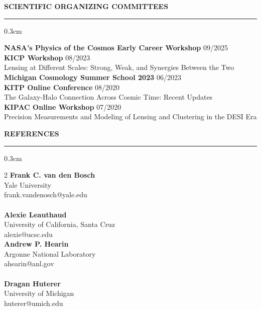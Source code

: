 \documentclass[12pt]{article}
\renewenvironment{section}[1]
  {
  \medskip
  {\color{aublue} \MakeUppercase{\bf #1}}
  \smallskip
  \hrule
  \medskip
  \begin{adjustwidth}{0.3cm}{}
  }
  {
  \end{adjustwidth}
  }
\newcommand{\entry}[3]{{\bf #1} \hfill {#2} \\ {#3}}
\begin{document}
\begin{section}{Scientific Organizing Committees}
  \entry{NASA's Physics of the Cosmos Early Career Workshop}{09/2025}{}
  \entry{KICP Workshop}{08/2023}{Lensing at Different Scales: Strong, Weak, and Synergies Between the Two} \\
  \entry{Michigan Cosmology Summer School 2023}{06/2023}{}
  \entry{KITP Online Conference}{08/2020}{The Galaxy-Halo Connection Across Cosmic Time: Recent Updates}\\
  \entry{KIPAC Online Workshop}{07/2020}{Precision Measurements and Modeling of Lensing and Clustering in the DESI Era}
\end{section}

\newpage

\begin{section}{References}
    \begin{multicols*}{2}
    \entry{Frank C. van den Bosch}{}{Yale University\\frank.vandenosch@yale.edu} \\ \\
    \entry{Alexie Leauthaud}{}{University of California, Santa Cruz\\alexie@ucsc.edu} \columnbreak \\
    \entry{Andrew P. Hearin}{}{Argonne National Laboratory\\ahearin@anl.gov} \\ \\
    \entry{Dragan Huterer}{}{University of Michigan\\huterer@umich.edu}
    \end{multicols*}
\end{section}
\end{document}
